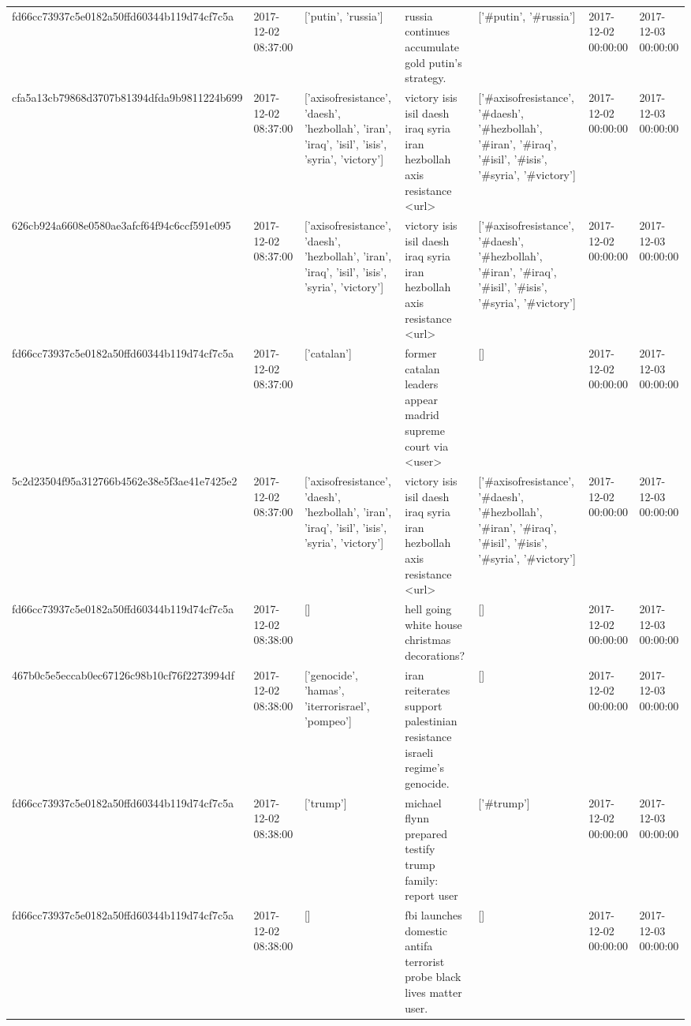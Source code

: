 \begin{tabular}{lllllll}
fd66cc73937c5e0182a50ffd60344b119d74cf7c5a & 2017-12-02 08:37:00 & ['putin', 'russia'] & russia continues accumulate gold putin's strategy. & ['#putin', '#russia'] & 2017-12-02 00:00:00 & 2017-12-03 00:00:00 \\
cfa5a13cb79868d3707b81394dfda9b9811224b699 & 2017-12-02 08:37:00 & ['axisofresistance', 'daesh', 'hezbollah', 'iran', 'iraq', 'isil', 'isis', 'syria', 'victory'] & victory isis isil daesh iraq syria iran hezbollah axis resistance <url> & ['#axisofresistance', '#daesh', '#hezbollah', '#iran', '#iraq', '#isil', '#isis', '#syria', '#victory'] & 2017-12-02 00:00:00 & 2017-12-03 00:00:00 \\
626cb924a6608e0580ae3afcf64f94c6ccf591e095 & 2017-12-02 08:37:00 & ['axisofresistance', 'daesh', 'hezbollah', 'iran', 'iraq', 'isil', 'isis', 'syria', 'victory'] & victory isis isil daesh iraq syria iran hezbollah axis resistance <url> & ['#axisofresistance', '#daesh', '#hezbollah', '#iran', '#iraq', '#isil', '#isis', '#syria', '#victory'] & 2017-12-02 00:00:00 & 2017-12-03 00:00:00 \\
fd66cc73937c5e0182a50ffd60344b119d74cf7c5a & 2017-12-02 08:37:00 & ['catalan'] & former catalan leaders appear madrid supreme court via <user> & [] & 2017-12-02 00:00:00 & 2017-12-03 00:00:00 \\
5c2d23504f95a312766b4562e38e5f3ae41e7425e2 & 2017-12-02 08:37:00 & ['axisofresistance', 'daesh', 'hezbollah', 'iran', 'iraq', 'isil', 'isis', 'syria', 'victory'] & victory isis isil daesh iraq syria iran hezbollah axis resistance <url> & ['#axisofresistance', '#daesh', '#hezbollah', '#iran', '#iraq', '#isil', '#isis', '#syria', '#victory'] & 2017-12-02 00:00:00 & 2017-12-03 00:00:00 \\
fd66cc73937c5e0182a50ffd60344b119d74cf7c5a & 2017-12-02 08:38:00 & [] & hell going white house christmas decorations? & [] & 2017-12-02 00:00:00 & 2017-12-03 00:00:00 \\
467b0c5e5eccab0ec67126c98b10cf76f2273994df & 2017-12-02 08:38:00 & ['genocide', 'hamas', 'iterrorisrael', 'pompeo'] & iran reiterates support palestinian resistance israeli regime's genocide. & [] & 2017-12-02 00:00:00 & 2017-12-03 00:00:00 \\
fd66cc73937c5e0182a50ffd60344b119d74cf7c5a & 2017-12-02 08:38:00 & ['trump'] & michael flynn prepared testify trump family: report user & ['#trump'] & 2017-12-02 00:00:00 & 2017-12-03 00:00:00 \\
fd66cc73937c5e0182a50ffd60344b119d74cf7c5a & 2017-12-02 08:38:00 & [] & fbi launches domestic antifa terrorist probe black lives matter user. & [] & 2017-12-02 00:00:00 & 2017-12-03 00:00:00 \\

\end{tabular}
